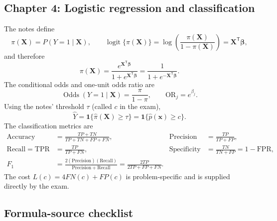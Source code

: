 \documentclass[11pt]{article}
\newcommand{\trans}{\mathsf T}
\newcommand{\logit}{\operatorname{logit}}
\begin{document}
\subsection{Chapter 4: Logistic regression and classification}

The notes define
\[
\pi(\bm X)=P(Y=1\mid\bm X),
\qquad
\logit\{\pi(\bm X)\}
=\log\left(\frac{\pi(\bm X)}{1-\pi(\bm X)}\right)
=\bm X^\trans\bm\beta,
\]
and therefore
\[
\pi(\bm X)=\frac{e^{\bm X^\trans\bm\beta}}
{1+e^{\bm X^\trans\bm\beta}}
=\frac1{1+e^{-\bm X^\trans\bm\beta}}.
\]
The conditional odds and one-unit odds ratio are
\[
\operatorname{Odds}(Y=1\mid\bm X)=\frac{\pi}{1-\pi},
\qquad
\mathrm{OR}_j=e^{\beta_j}.
\]
Using the notes' threshold \(\tau\) (called \(c\) in the exam),
\[
\hat Y=\bm1\{\hat\pi(\bm X)\geq\tau\}
=\bm1\{\hat p(\bm x)\geq c\}.
\]
The classification metrics are
\[
\begin{aligned}
\mathrm{Accuracy}&=\frac{TP+TN}{TP+TN+FP+FN},&
\mathrm{Precision}&=\frac{TP}{TP+FP},\\
\mathrm{Recall}=\mathrm{TPR}&=\frac{TP}{TP+FN},&
\mathrm{Specificity}&=\frac{TN}{TN+FP}=1-\mathrm{FPR},\\
F_1&=\frac{2(\mathrm{Precision})(\mathrm{Recall})}
{\mathrm{Precision}+\mathrm{Recall}}
=\frac{2TP}{2TP+FP+FN}.&&
\end{aligned}
\]
The cost \(L(c)=4FN(c)+FP(c)\) is problem-specific and is supplied directly
by the exam.

\clearpage
\subsection{Formula-source checklist}
\end{document}
